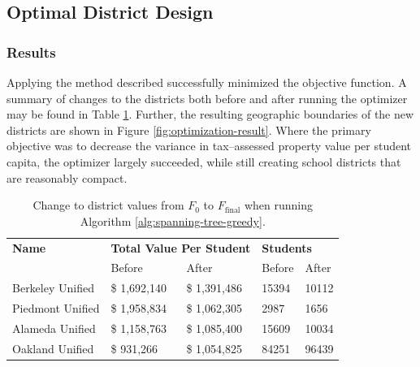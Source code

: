 \documentclass{article}
\begin{document}

\subsection{Optimal District Design}
\subsubsection{Results}
Applying the method described successfully minimized the objective function. A summary of changes to the districts both before and after running the optimizer may be found in Table \ref{tab:optimization-result}. Further, the resulting geographic boundaries of the new districts are shown in Figure \ref{fig:optimization-result}. Where the primary objective was to decrease the variance in tax--assessed property value per student capita, the optimizer largely succeeded, while still creating school districts that are reasonably compact.

\begin{table}[H]
    \centering
    \begin{tabular}{l|ll|ll}
         \textbf{Name}      & \multicolumn{2}{l|}{\textbf{Total Value Per Student}}    & \multicolumn{2}{l}{\textbf{Students}}\\
                            & Before                                      & After      & Before & After \\ \hline
         Berkeley Unified   & \$ 1,692,140                                & \$ 1,391,486 & 15394  & 10112 \\
         Piedmont Unified   & \$ 1,958,834                                & \$ 1,062,305 & 2987   & 1656 \\ 
         Alameda Unified    & \$ 1,158,763                                & \$ 1,085,400 & 15609  & 10034  \\ 
         Oakland Unified    & \$   931,266                                & \$ 1,054,825 & 84251  & 96439 \\ 
    \end{tabular}
    \caption{Change to district values from \(F_0\) to \(F_\text{final}\) when running Algorithm \ref{alg:spanning-tree-greedy}.}
    \label{tab:optimization-result}
\end{table}
\end{document}
